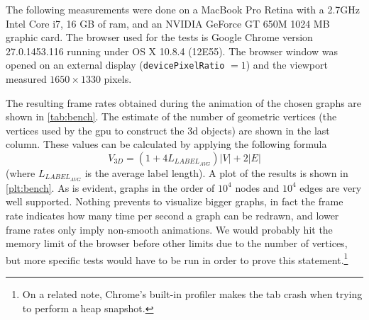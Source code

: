 The following measurements were done on a MacBook Pro Retina with a 2.7GHz Intel Core i7, 16 GB of \gls{ram}, and an NVIDIA GeForce GT 650M 1024 MB graphic card. The browser used for the tests is Google Chrome version 27.0.1453.116 running under OS X 10.8.4 (12E55). The browser window was opened on an external display (\texttt{devicePixelRatio} $= 1$) and the viewport measured $1650\times1330$ pixels.

The resulting frame rates obtained during the animation of the chosen graphs are shown in \vref{tab:bench}. The estimate of the number of geometric vertices (the vertices used by the \gls{gpu} to construct the \gls{3d} objects) are shown in the last column. These values can be calculated by applying the following formula
\[
  V_{3D} = (1 + 4 L_{\mathit{LABEL}_\mathit{AVG}}) |V| + 2 |E|
\]
(where $L_{\mathit{LABEL}_\mathit{AVG}}$ is the average label length). A plot of the results is shown in \vref{plt:bench}. As is evident, graphs in the order of $10^4$ nodes and $10^4$ edges are very well supported. Nothing prevents to visualize bigger graphs, in fact the frame rate indicates how many time per second a graph can be redrawn, and lower frame rates only imply non-smooth animations. We would probably hit the memory limit of the browser before other limits due to the number of vertices, but more specific tests would have to be run in order to prove this statement.\footnote{On a related note, Chrome's built-in profiler makes the tab crash when trying to perform a heap snapshot.}

